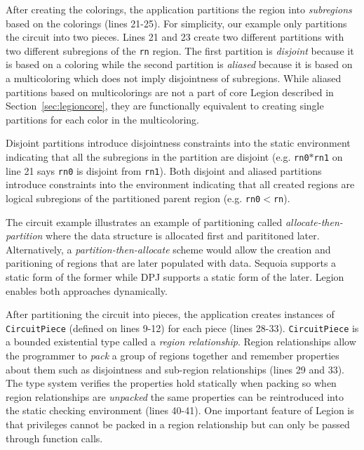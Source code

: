 After creating the colorings, the application partitions the region into {\em subregions} based on 
the colorings (lines 21-25).  For simplicity, our example only partitions the circuit into two pieces.  Lines
21 and 23 create two different partitions with two different subregions of the {\tt rn} region.  The first partition is
{\em disjoint} because it is based on a coloring while the second partition is {\em aliased}
because it is based on a multicoloring which does not imply disjointness of subregions.  While 
aliased partitions based on multicolorings are not a part of core Legion described in Section~\ref{sec:legioncore}, 
they are functionally equivalent to creating single partitions for each color in the multicoloring.

Disjoint partitions introduce
disjointness constraints into the static environment indicating that all the subregions in the partition are 
disjoint (e.g. {\tt rn0}$*${\tt rn1} on line 21 says {\tt rn0} is disjoint from {\tt rn1}).
Both disjoint and aliased partitions introduce constraints into the environment indicating that all
created regions are logical subregions of the partitioned parent region (e.g. {\tt rn0}$<${\tt rn}).

The circuit example illustrates an example of partitioning called {\em allocate-then-partition}
where the data structure is allocated first and parititoned later.  Alternatively, a
{\em partition-then-allocate} scheme would allow the creation and paritioning of regions that
are later populated with data.  Sequoia supports a static form of the former while DPJ supports
a static form of the later.  Legion enables both approaches dynamically.

After partitioning the circuit into pieces, the application creates instances of {\tt CircuitPiece} 
(defined on lines 9-12) for each piece (lines 28-33).  {\tt CircuitPiece} is a bounded existential 
type called a {\em region relationship}.  
Region relationships allow the programmer to {\em pack} a group of regions together and remember properties about
them such as disjointness and sub-region relationships (lines 29 and 33).  The type system verifies 
the properties hold statically when packing so when region relationships are {\em unpacked} the same properties can
be reintroduced into the static checking environment (lines 40-41).  One important feature of Legion
is that privileges cannot be packed in a region relationship but can only be passed through function calls.

